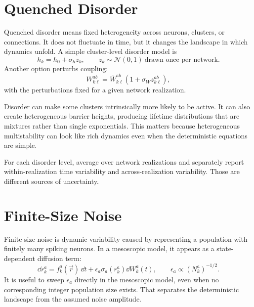 \section{Quenched Disorder}
\label{sec:phase-quenched-disorder}

Quenched disorder means fixed heterogeneity across neurons, clusters, or connections. It does not fluctuate in time, but it changes the landscape in which dynamics unfold. A simple cluster-level disorder model is
%
\begin{equation}
  h_k = h_0 + \sigma_h z_k,
  \qquad
  z_k\sim\mathcal{N}(0,1)
  \ \text{drawn once per network}.
  \label{eq:quenched-input-disorder}
\end{equation}
%
Another option perturbs coupling:
%
\begin{equation}
  W_{k\ell}^{ab}
  =
  \bar W_{k\ell}^{ab}
  \left(1+\sigma_W z_{k\ell}^{ab}\right),
  \label{eq:quenched-coupling-disorder}
\end{equation}
%
with the perturbations fixed for a given network realization.

Disorder can make some clusters intrinsically more likely to be active. It can also create heterogeneous barrier heights, producing lifetime distributions that are mixtures rather than single exponentials. This matters because heterogeneous multistability can look like rich dynamics even when the deterministic equations are simple.

For each disorder level, average over network realizations and separately report within-realization time variability and across-realization variability. Those are different sources of uncertainty.

\section{Finite-Size Noise}
\label{sec:phase-finite-size-noise}

Finite-size noise is dynamic variability caused by representing a population with finitely many spiking neurons. In a mesoscopic model, it appears as a state-dependent diffusion term:
%
\begin{equation}
  \dd r_k^a
  =
  f_k^a(\vec r)\,\dd t
  +
  \epsilon_a
  \sigma_a(r_k^a)
  \dd W_k^a(t),
  \qquad
  \epsilon_a \propto {(N_k^a)}^{-1/2}.
  \label{eq:finite-size-noise-control}
\end{equation}
%
It is useful to sweep $\epsilon_a$ directly in the mesoscopic model, even when no corresponding integer population size exists. That separates the deterministic landscape from the assumed noise amplitude.

